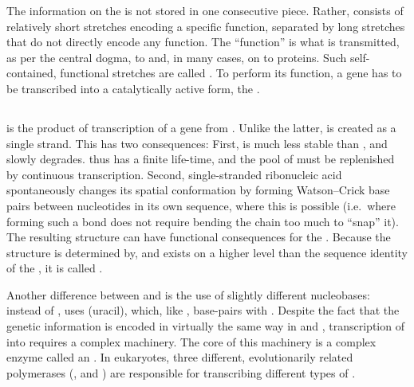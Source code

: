 
The information on the \dna is not stored in one consecutive piece. Rather, \dna
consists of relatively short stretches encoding a specific function, separated
by long stretches that do not directly encode any function. The “function” is
what is transmitted, as per the central dogma, to \rna and, in many cases, on to
proteins. Such self-contained, functional stretches are called
. To perform its function, a gene has
to be transcribed into a catalytically active form, the \rna.

\subsection{}

\rna is the product of transcription of a gene from \dna. Unlike the latter,
\rna is created as a single strand. This has two consequences: First, \rna is
much less stable than \dna, and slowly degrades. \rna thus has a finite
life-time, and the pool of \rna must be replenished by continuous transcription.
Second, single-stranded ribonucleic acid spontaneously changes its spatial
conformation by forming Watson--Crick base pairs between nucleotides in its own
sequence, where this is  possible (i.e.\ where forming such a bond
does not require bending the chain too much to “snap” it). The resulting
structure can have functional consequences for the \rna. Because the structure
is determined by, and exists on a higher level than the sequence identity of the
\rna, it is called .

Another difference between \dna and \rna is the use of slightly different
nucleobases: instead of \nT, \rna uses \nU (uracil), which, like \nT, base-pairs
with \nA. Despite the fact that the genetic information is encoded in virtually
the same way in \dna and \rna, transcription of \dna into \rna requires a
complex machinery. The core of this machinery is a complex enzyme called an
. In eukaryotes, three different, evolutionarily related
\rna polymerases (,  and ) are responsible for transcribing
different types of \rna.


